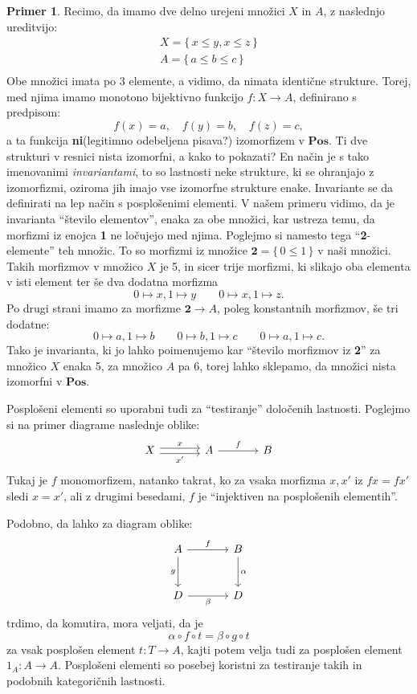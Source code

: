 \documentclass[12pt,a4paper]{book}
\theoremstyle{definition}
\theoremstyle{plain}
\theoremstyle{definition}
\newtheorem{primer}{Primer}[section]
\theoremstyle{remark}
\newcommand{\cat}[1]{\textbf{#1}}
\renewcommand{\set}[1]{\{\,#1\,\}}
\begin{document}
\begin{primer}
Recimo, da imamo dve delno urejeni množici $X$ in $A$, z naslednjo ureditvijo:
\begin{align*}
X = \set{x \leq y, x \leq z} \\
A = \set{a \leq b \leq c} \\
\end{align*}
Obe množici imata po 3 elemente, a vidimo, da nimata identične strukture. Torej, med njima imamo monotono bijektivno funkcijo $f : X \to A$, definirano s predpisom:
$$f(x) = a, \quad f(y) = b, \quad f(z) = c,$$
a ta funkcija \textbf{ni}(legitimno odebeljena pisava?) izomorfizem v $\cat{Pos}$. Ti dve strukturi v resnici nista izomorfni, a kako to pokazati? En način je s tako imenovanimi \emph{invariantami}, to so lastnosti neke strukture, ki se ohranjajo z izomorfizmi, oziroma jih imajo vse izomorfne strukture enake. Invariante se da definirati na lep način s posplošenimi elementi. V našem primeru vidimo, da je invarianta "`število elementov"', enaka za obe množici, kar ustreza temu, da morfizmi iz enojca \textbf{1} ne ločujejo med njima. Poglejmo si namesto tega "`\textbf{2}-elemente"' teh množic. To so morfizmi iz množice $\textbf{2} = \set{0 \leq 1}$ v naši množici. Takih morfizmov v množico $X$ je 5, in sicer trije morfizmi, ki slikajo oba elementa v isti element ter še dva dodatna morfizma
$$0 \mapsto x, 1 \mapsto y \qquad 0 \mapsto x, 1 \mapsto z.$$
Po drugi strani imamo za morfizme $\textbf{2} \to A$, poleg konstantnih morfizmov, še tri dodatne:
$$0 \mapsto a, 1 \mapsto b \qquad 0 \mapsto b, 1 \mapsto c \qquad 0 \mapsto a, 1 \mapsto c.$$
Tako je invarianta, ki jo lahko poimenujemo kar "`število morfizmov iz \textbf{2}"' za množico $X$ enaka 5, za množico $A$ pa 6, torej lahko sklepamo, da množici nista izomorfni v $\cat{Pos}$.
\end{primer}
%
Posplošeni elementi so uporabni tudi za "`testiranje"' določenih lastnosti. Poglejmo si na primer diagrame naslednje oblike:
%
$$\begin{tikzcd}[column sep=large]
X \ar[r, shift left, "x"] \ar[r, shift right, "x'"'] & A \ar[r, "f"] & B
\end{tikzcd}$$
Tukaj je $f$ monomorfizem, natanko takrat, ko za vsaka morfizma $x, x'$ iz $fx = fx'$ sledi $x = x'$, ali z drugimi besedami, $f$ je "`injektiven na posplošenih elementih"'.
%

Podobno, da lahko za diagram oblike:
$$\begin{tikzcd}[column sep=large, row sep=large]
A \ar[d, "g"'] \ar[r, "f"] & B \ar[d, "\alpha"] \\
D \ar[r, "\beta"'] & D
\end{tikzcd}$$
trdimo, da komutira, mora veljati, da je 
$$\alpha \circ f \circ  t = \beta \circ g \circ t$$
za vsak posplošen element $t : T \to A$, kajti potem velja tudi za posplošen element $1_A : A \to A$. Posplošeni elementi so posebej koristni za testiranje takih in podobnih kategoričnih lastnosti.
\end{document}
